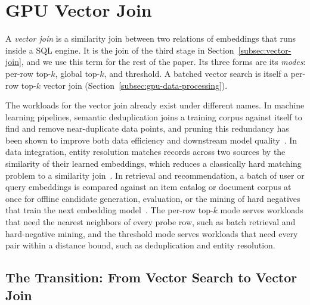 \section{GPU Vector Join}\label{sec:motivation}

A \emph{vector join} is a similarity join between two relations of embeddings that runs inside a SQL engine.
It is the join of the third stage in Section~\ref{subsec:vector-join}, and we use this term for the rest of the paper.
Its three forms are its \emph{modes}: per-row top-$k$, global top-$k$, and threshold.
A batched vector search is itself a per-row top-$k$ vector join (Section~\ref{subsec:gpu-data-processing}).

The workloads for the vector join already exist under different names.
In machine learning pipelines, semantic deduplication joins a training corpus against itself to find and remove near-duplicate data points, and pruning this redundancy has been shown to improve both data efficiency and downstream model quality~\cite{HuSieveIVF26, AbbasSemDeDup23}.
In data integration, entity resolution matches records across two sources by the similarity of their learned embeddings, which reduces a classically hard matching problem to a similarity join~\cite{SantanaEMJoin25, SantanaRibeiro23}.
In retrieval and recommendation, a batch of user or query embeddings is compared against an item catalog or document corpus at once for offline candidate generation, evaluation, or the mining of hard negatives that train the next embedding model~\cite{HuangFBRetrieval20, XiongANCE21, ThakurBEIR21}.
The per-row top-$k$ mode serves workloads that need the nearest neighbors of every probe row, such as batch retrieval and hard-negative mining, and the threshold mode serves workloads that need every pair within a distance bound, such as deduplication and entity resolution.

\subsection{The Transition: From Vector Search to Vector Join}\label{subsec:the-transition}




